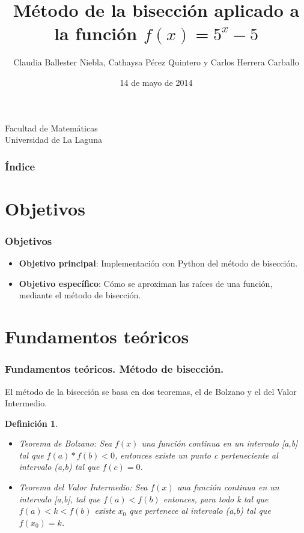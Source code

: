 \documentclass{beamer}
\title[Método de la bisección]{Método de la bisección aplicado a la función $f(x)=5^x-5$}
\author[Claudia, Cathaysa, Carlos]{Claudia Ballester Niebla, Cathaysa Pérez Quintero y Carlos Herrera Carballo}
\date[14-05-2014]{14 de mayo de 2014}
\newtheorem{definicion}{Definición}
\begin{document}
  
\begin{frame}

  
  \titlepage

  \begin{small}
    \begin{center}
     Facultad de Matemáticas \\
     Universidad de La Laguna
    \end{center}
  \end{small}

\end{frame}

\begin{frame}
  \frametitle{Índice}
  \tableofcontents[pausesections]
\end{frame}
\section{Objetivos}
\begin{frame}
\frametitle{Objetivos}
\begin{itemize}
  \item {\bf Objetivo principal}: Implementación con Python del método de bisección.\pause
  \item {\bf Objetivo específico}: Cómo se aproximan las raíces de una función, mediante el método de bisección.
\end{itemize}
\end{frame}

\section{Fundamentos teóricos}
\begin{frame}
\frametitle{Fundamentos teóricos. Método de bisección.}
El método de la bisección se basa en dos teoremas, el de Bolzano y el del Valor Intermedio.\pause
\begin{definicion}
\begin{itemize}
\item Teorema de Bolzano: Sea $f(x)$ una función continua en un intervalo [a,b] tal que $f(a)*f(b)<0$, entonces existe un punto c perteneciente al intervalo (a,b) tal que $f(c)=0$.\pause
\item Teorema del Valor Intermedio: Sea $f(x)$ una función continua en un intervalo [a,b], tal que $f(a)<f(b)$ entonces, para todo k tal que $f(a)<k<f(b)$ existe $x_0$ que pertenece al intervalo (a,b) tal que $f(x_0)=k$.
\end{itemize}
\end{definicion}

\end{frame}
\end{document}
